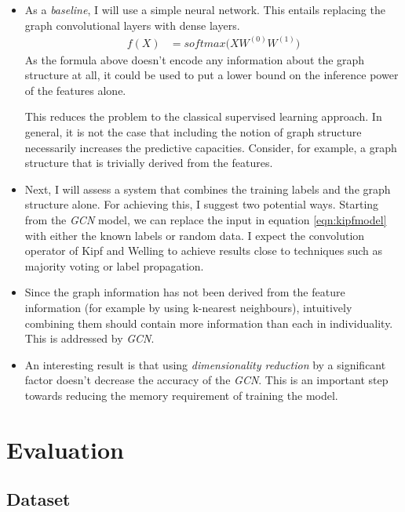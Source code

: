 \documentclass[10pt,a4]{article}
\begin{document}
    \begin{itemize} 
    \item As a \emph{baseline}, I will use a simple neural network. This entails 
    replacing the graph convolutional layers with dense layers.
    \begin{align*}
        f(X) &= softmax \big(XW^{(0)}W^{(1)} \big)
    \end{align*}
    As the formula above doesn't encode any information about the graph structure at 
    all, it could be used to put a lower bound on the inference power of the features alone.

    This reduces the problem to the classical supervised learning approach. In general, 
    it is not the case that including the notion of graph structure 
    necessarily increases the predictive capacities. Consider, for example, a graph 
    structure that is trivially derived from the features.

    \item Next, I will assess a system that combines the training labels
    and the graph structure alone. For achieving this, I suggest two potential ways. 
    Starting from the \emph{GCN} model, we can replace the input in equation 
    \ref{eqn:kipfmodel} with either the known labels or random data. 
    I expect the convolution operator of Kipf and Welling to achieve results close 
    to techniques such as majority voting or label propagation.
    
    \item Since the graph information has not been derived from the feature information 
    (for example by using k-nearest neighbours), intuitively combining them should
    contain more information than each in individuality. This is addressed by 
    \emph{GCN}. 
    
    \item An interesting result is that using \emph{dimensionality reduction} by 
    a significant factor doesn't decrease the accuracy of the \emph{GCN}. This is an 
    important step towards reducing the memory requirement of training the model.
    
    \end{itemize}
    \section{Evaluation}
    
    \subsection{Dataset} 
\end{document}
